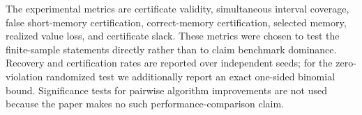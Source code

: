 \documentclass[letterpaper]{article} %
\begin{document}
The experimental metrics are certificate validity, simultaneous interval
coverage, false short-memory certification, correct-memory certification,
selected memory, realized value loss, and certificate slack.  These metrics
were chosen to test the finite-sample statements directly rather than to claim
benchmark dominance.  Recovery and certification rates are reported over
independent seeds; for the zero-violation randomized test we additionally
report an exact one-sided binomial bound.  Significance tests for pairwise
algorithm improvements are not used because the paper makes no such
performance-comparison claim.


\end{document}
